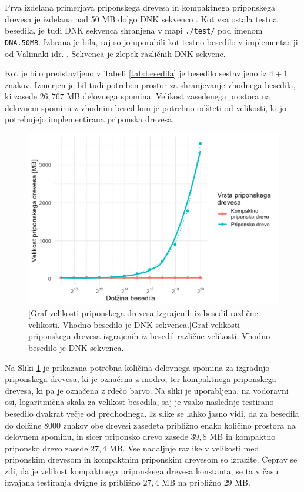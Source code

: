 \newpage
Prva izdelana primerjava priponskega drevesa in kompaktnega priponskega drevesa je izdelana nad 50 MB dolgo DNK sekvenco \cite{podatki}. Kot vsa ostala testna besedila, je tudi DNK sekvenca shranjena v mapi \verb|./test/| pod imenom \verb|DNA.50MB|. Izbrana je bila, saj so jo uporabili kot testno besedilo v implementaciji od Välimäki idr. \cite{Valimaki2007}. Sekvenca je zlepek različnih DNK sekvenc.

Kot je bilo predstavljeno v Tabeli \ref{tab:besedila} je besedilo sestavljeno iz $4+1$ znakov. Izmerjen je bil tudi potreben prostor za shranjevanje vhodnega besedila, ki zasede $26,767$ MB delovnega spomina. Velikost zasedenega prostora na delovnem spominu z vhodnim besedilom je potrebno odšteti od velikosti, ki jo potrebujejo implementirana priponska drevesa.

\begin{figure}[htb]
    \centering
    \includegraphics[width=\textwidth]{Slike/velikostDrecvesaNovPC.png}
    [Graf velikosti priponskega drevesa izgrajenih iz besedil različne velikosti. Vhodno besedilo je DNK sekvenca.]{Graf velikosti priponskega drevesa izgrajenih iz besedil različne velikosti. Vhodno besedilo je DNK sekvenca.} 
    \label{fig:VelikostGraf}
\end{figure}

Na Sliki \ref{fig:VelikostGraf} je prikazana potrebna količina delovnega spomina za izgradnjo priponskega drevesa, ki je označena z modro, ter kompaktnega priponskega drevesa, ki pa je označena z rdečo barvo. Na sliki je uporabljena, na vodoravni osi, logaritmična skala za velikost besedila, saj je vsako naslednje testirano besedilo dvakrat večje od predhodnega. Iz slike se lahko jasno vidi, da za besedila do dolžine 8000 znakov obe drevesi zasedeta približno enako količino prostora na delovnem spominu, in sicer priponsko drevo zasede $39,8$ MB in kompaktno priponsko drevo zasede $27,4$ MB. Vse nadaljnje razlike v velikosti med priponskim drevesom in kompaktnim priponskim drevesom so izrazite. Čeprav se zdi, da je velikost kompaktnega priponskega drevesa konstanta, se ta v času izvajana testiranja dvigne iz približno $27,4$ MB na približno $29$ MB.

